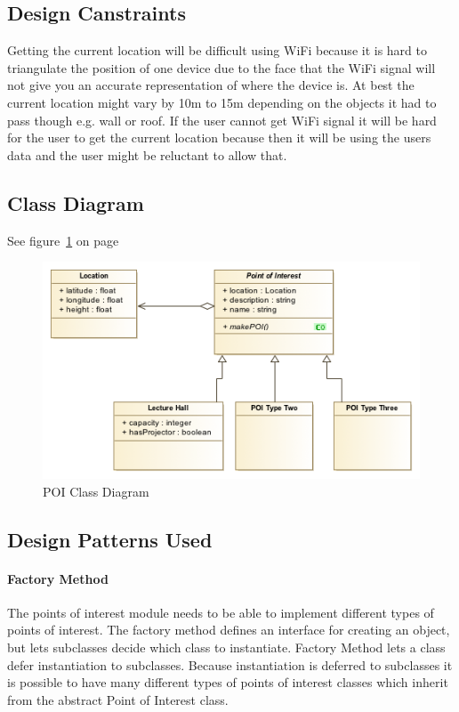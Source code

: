\subsection{Design Canstraints}
Getting the current location will be difficult using WiFi because it is hard to triangulate the position of one device due to the face that the WiFi signal will not give you an accurate representation of where the device is. At best the current location might vary by 10m to 15m depending on the objects it had to pass though e.g. wall or roof. If the user cannot get WiFi signal it will be hard for the user to get the current location because then it will be using the users data and the user might be reluctant to allow that.

\subsection{Class Diagram}
See figure~\ref{fig:POI_Class_Diagram} on page~\pageref{fig:POI_Class_Diagram}
\begin{figure}[H]
	\centering
	\includegraphics[scale=0.54]{POI/poi_class_diagram.png}
	\caption{POI Class Diagram}
	\label{fig:POI_Class_Diagram}
\end{figure}

\subsection{Design Patterns Used}
    \paragraph{Factory Method}
    The points of interest module needs to be able to implement different types of points of interest. The factory method defines an interface for creating an object, but lets subclasses decide which class to instantiate. Factory Method lets a class defer instantiation to subclasses. Because instantiation is deferred to subclasses it is possible to have many different types of points of interest classes which inherit from the abstract Point of Interest class.
 
